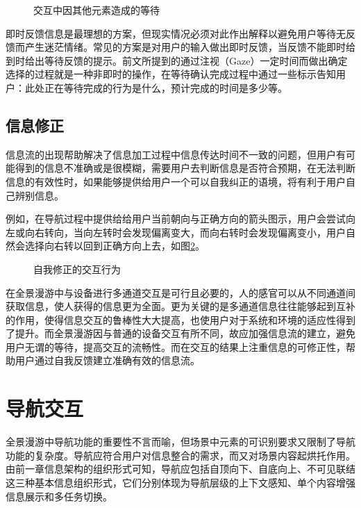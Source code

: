 \begin{figure}[htp]
\centering
{}
\caption{交互中因其他元素造成的等待}
\label{fig:stream}
\end{figure}

即时反馈信息是最理想的方案，但现实情况必须对此作出解释以避免用户等待无反馈而产生迷茫情绪。常见的方案是对用户的输入做出即时反馈，当反馈不能即时给到时给出等待反馈的提示。前文所提到的通过注视（Gaze）一定时间而做出确定选择的过程就是一种非即时的操作，在等待确认完成过程中通过一些标示告知用户：此处正在等待完成的行为是什么，预计完成的时间是多少等。

\subsection{信息修正}
信息流的出现帮助解决了信息加工过程中信息传达时间不一致的问题，但用户有可能得到的信息不准确或是很模糊，需要用户去判断信息是否符合预期，在无法判断信息的有效性时，如果能够提供给用户一个可以自我纠正的语境，将有利于用户自己辨别信息。

例如，在导航过程中提供给给用户当前朝向与正确方向的箭头图示，用户会尝试向左或向右转向，当向左转时会发现偏离变大，而向右转时会发现偏离变小，用户自然会选择向右转以回到正确方向上去，如图\ref{fig:correct}。

\begin{figure}[htp]
\centering
{}
\caption{自我修正的交互行为}
\label{fig:correct}
\end{figure}

在全景漫游中与设备进行多通道交互是可行且必要的，人的感官可以从不同通道间获取信息，使人获得的信息更为全面。更为关键的是多通道信息往往能够起到互补的作用，使得信息交互的鲁棒性大大提高，也使用户对于系统和环境的适应性得到了提升。而全景漫游因与普通的设备交互有所不同，故应加强信息流的建立，避免用户无谓的等待，提高交互的流畅性。而在交互的结果上注重信息的可修正性，帮助用户通过自我反馈建立准确有效的信息流。

\section{导航交互}
全景漫游中导航功能的重要性不言而喻，但场景中元素的可识别要求又限制了导航功能的复杂度。导航应符合用户对信息整合的需求，而又对场景内容起烘托作用。由前一章信息架构的组织形式可知，导航应包括自顶向下、自底向上、不可见联结这三种基本信息组织形式，它们分别体现为导航层级的上下文感知、单个内容增强信息展示和多任务切换。

